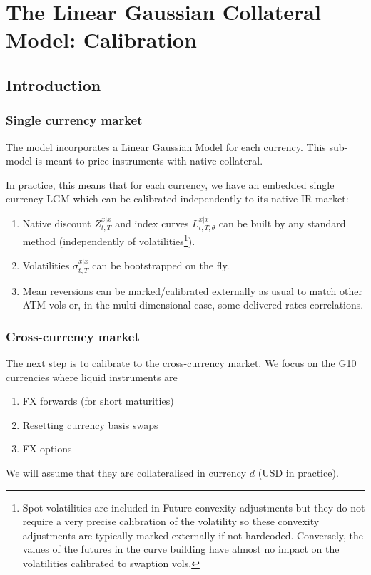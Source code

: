 \documentclass[11pt,english]{amsart}
\theoremstyle{definition}
\begin{document}
\newpage%
\section{The Linear Gaussian Collateral Model: Calibration}

\setcounter{subsection}{-1}
\subsection{Introduction}

\subsubsection{Single currency market}%
The model incorporates a Linear Gaussian Model for each currency. This sub-model is meant to price instruments with native collateral.

In practice, this means that for each currency, we have an embedded single currency LGM which can be calibrated independently to its native IR market:
\begin{enumerate}
\item Native discount $Z^{x|x}_{t,T}$  and index curves  $L^{x|x}_{t,T;\theta}$ can be built by any standard method (independently of volatilities\footnote{Spot volatilities are included in Future convexity adjustments but they do not require a very precise calibration of the volatility so these convexity adjustments are typically marked externally if not hardcoded. Conversely, the values of the futures in the curve building have almost no impact on the volatilities calibrated to swaption vols.}).
\item Volatilities $\sigma^{x|x}_{t,T}$  can be bootstrapped on the fly.
\item Mean reversions can be marked/calibrated externally as usual to match other ATM vols or, in the multi-dimensional case, some delivered rates correlations.
\end{enumerate}

\subsubsection{Cross-currency market}%
The next step is to calibrate to the cross-currency market. We focus on the G10 currencies where liquid instruments are
\begin{enumerate}
\item FX forwards (for short maturities)
\item Resetting currency basis swaps
\item FX options
\end{enumerate}
We will assume that they are collateralised in currency $d$ (USD in practice).
\end{document}
